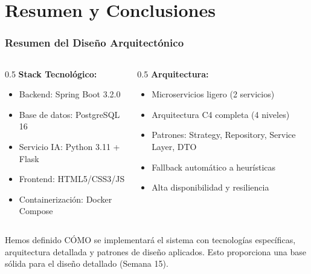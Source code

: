 \documentclass[aspectratio=169]{beamer}
\begin{document}
\section{Resumen y Conclusiones}

\begin{frame}
\frametitle{Resumen del Diseño Arquitectónico}

\begin{columns}
\begin{column}{0.5\textwidth}
\textbf{Stack Tecnológico:}
\begin{itemize}
\item Backend: Spring Boot 3.2.0
\item Base de datos: PostgreSQL 16
\item Servicio IA: Python 3.11 + Flask
\item Frontend: HTML5/CSS3/JS
\item Containerización: Docker Compose
\end{itemize}
\end{column}

\begin{column}{0.5\textwidth}
\textbf{Arquitectura:}
\begin{itemize}
\item Microservicios ligero (2 servicios)
\item Arquitectura C4 completa (4 niveles)
\item Patrones: Strategy, Repository, Service Layer, DTO
\item Fallback automático a heurísticas
\item Alta disponibilidad y resiliencia
\end{itemize}
\end{column}
\end{columns}

\vspace{0.5cm}

\begin{tcolorbox}[colback=blue!5, colframe=blue!50, title=Objetivo Cumplido]
Hemos definido CÓMO se implementará el sistema con tecnologías específicas, arquitectura detallada y patrones de diseño aplicados. Esto proporciona una base sólida para el diseño detallado (Semana 15).
\end{tcolorbox}

\end{frame}
\end{document}
